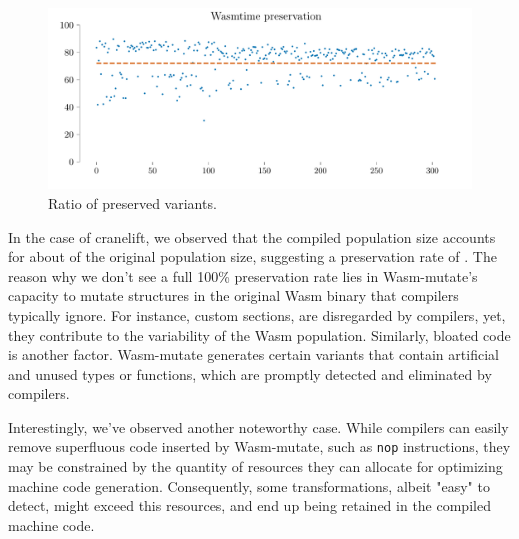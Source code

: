 \documentclass[sigplan,screen]{acmart}
\newcommand{\tool}{Wasm-mutate\xspace}
\newcommand{\wasm}{Wasm\xspace}
\begin{document}
\begin{figure}
    \centering
    \includegraphics[width=\linewidth]{plots/rq1/preservation.pdf}
    \caption{Ratio of preserved variants.}
  \label{rq1:plot:preservation}
\end{figure}

In the case of cranelift, we observed that the compiled population size accounts for about \preserved of the original population size, suggesting a preservation rate of \preserved. 
The reason why we don't see a full 100\% preservation rate lies in \tool's capacity to mutate structures in the original \wasm binary that compilers typically ignore. 
For instance, custom sections, are disregarded by compilers, yet, they contribute to the variability of the \wasm population.
Similarly, bloated code is another factor. 
\tool generates certain variants that contain artificial and unused types or functions, which are promptly detected and eliminated by compilers.

Interestingly, we've observed another noteworthy case.
While compilers can easily remove superfluous code inserted by \tool, such as \texttt{nop} instructions, they may be constrained by the quantity of resources they can allocate for optimizing machine code generation. 
Consequently, some transformations, albeit "easy" to detect, might exceed this resources, and end up being retained in the compiled machine code.

\end{document}
